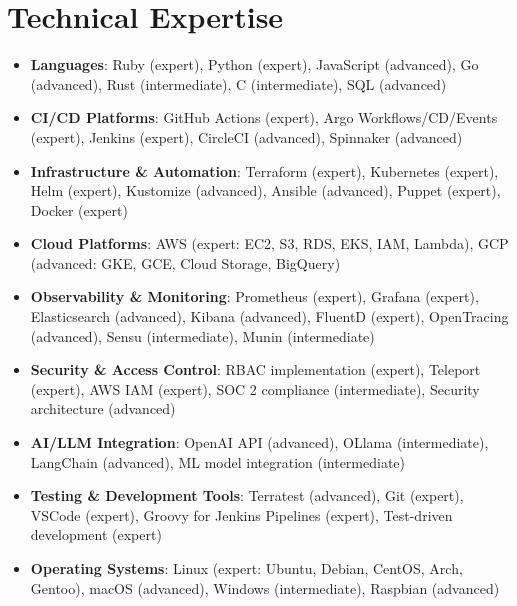 \documentclass[letterpaper,11pt]{article}
\newcommand{\resumeItem}[2]{
\item[\textsc{}]\small{
    \textbf{#1}{: #2 \vspace{-2pt}}
  }
}
\newcommand{\resumeSubItem}[2]{\resumeItem{#1}{#2}\vspace{-4pt}}
\newcommand{\resumeSubHeadingListStart}{\begin{itemize}[leftmargin=*]}
\newcommand{\resumeSubHeadingListEnd}{\end{itemize}}
\begin{document}
\section{Technical Expertise}
\resumeSubHeadingListStart
  \resumeSubItem{Languages}
    {Ruby (expert), Python (expert), JavaScript (advanced), Go (advanced), Rust (intermediate), C (intermediate), SQL (advanced)}
  \resumeSubItem{CI/CD Platforms}
    {GitHub Actions (expert), Argo Workflows/CD/Events (expert), Jenkins (expert), CircleCI (advanced), Spinnaker (advanced)}
  \resumeSubItem{Infrastructure \& Automation}
    {Terraform (expert), Kubernetes (expert), Helm (expert), Kustomize (advanced), Ansible (advanced), Puppet (expert), Docker (expert)}
  \resumeSubItem{Cloud Platforms}
    {AWS (expert: EC2, S3, RDS, EKS, IAM, Lambda), GCP (advanced: GKE, GCE, Cloud Storage, BigQuery)}
  \resumeSubItem{Observability \& Monitoring}
    {Prometheus (expert), Grafana (expert), Elasticsearch (advanced), Kibana (advanced), FluentD (expert), OpenTracing (advanced), Sensu (intermediate), Munin (intermediate)}
  \resumeSubItem{Security \& Access Control}
    {RBAC implementation (expert), Teleport (expert), AWS IAM (expert), SOC 2 compliance (intermediate), Security architecture (advanced)}
  \resumeSubItem{AI/LLM Integration}
    {OpenAI API (advanced), OLlama (intermediate), LangChain (advanced), ML model integration (intermediate)}
  \resumeSubItem{Testing \& Development Tools}
    {Terratest (advanced), Git (expert), VSCode (expert), Groovy for Jenkins Pipelines (expert), Test-driven development (expert)}
  \resumeSubItem{Operating Systems}
    {Linux (expert: Ubuntu, Debian, CentOS, Arch, Gentoo), macOS (advanced), Windows (intermediate), Raspbian (advanced)}
\resumeSubHeadingListEnd

\end{document}
